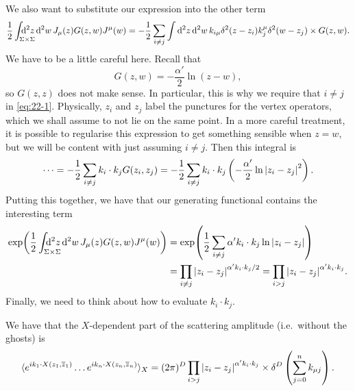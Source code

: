 We also want to substitute our expression into the other term
\begin{equation}
  \label{eq:22-1}
  \frac{1}{2} \int_{\mathrlap{\Sigma \times \Sigma}} \dd[2]{z} \dd[2]{w} J_{\mu}(z) G(z, w) J^{\mu}(w) = -\frac{1}{2} \sum_{i \neq j} \int \dd[2]{z} \dd[2]{w} k_{i \mu} \delta^2 (z - z_i) k_{j}^{\mu} \delta^2(w - z_j) \times G(z, w).
\end{equation}
We have to be a little careful here. Recall that
\begin{equation}
  G(z, w) = -\frac{\alpha'}{2} \ln(z - w),
\end{equation}
so $G(z, z)$ does not make sense. In particular, this is why we require that $i \neq j$ in \eqref{eq:22-1}.
Physically, $z_i$ and $z_j$ label the punctures for the vertex operators, which we shall assume to not lie on the same point.
In a more careful treatment, it is possible to regularise this expression to get something sensible when $z = w$, but we will be content with just assuming $i \neq j$.
Then this integral is
\begin{equation}
  \dots =-\frac{1}{2} \sum_{i \neq j} k_i \cdot k_j G(z_i, z_j) = -\frac{1}{2} \sum_{i \neq j} k_i \cdot k_j \left( -\frac{\alpha'}{2} \ln \abs{z_i - z_j}^2 \right).
\end{equation}
Putting this together, we have that our generating functional contains the interesting term
\begin{align}
  \exp(\frac{1}{2} \int_{\mathrlap{\Sigma \times \Sigma}} \dd[2]{z} \dd[2]{w} J_{\mu}(z) G(z, w) J^{\mu}(w)) &= \exp(\frac{1}{2} \sum_{i \neq j} \alpha' k_i \cdot k_j \ln \abs{z_i - z_j}) \\
  &= \prod_{i \neq j} \abs{z_i - z_j}^{\alpha' k_i \cdot k_j / 2}
  = \prod_{i > j} \abs{z_i - z_j} ^{\alpha' k_i \cdot k_j}.
\end{align}
Finally, we need to think about how to evaluate $k_i \cdot k_j$.

We have that the $X$-dependent part of the scattering amplitude (i.e.~without the ghosts) is
\begin{equation}
  \langle e^{i k_1 \cdot X(z_1, \overline{z}{}_1)} \dots e^{i k_n \cdot X(z_n, \overline{z}{}_n)}\rangle_X = (2 \pi)^D \prod_{i > j} \abs{z_{i} - z_{j}}^{\alpha' k_i \cdot k_j} \times \delta^D \left( \sum_{j = 0}^n k_{\mu j} \right).
\end{equation}
